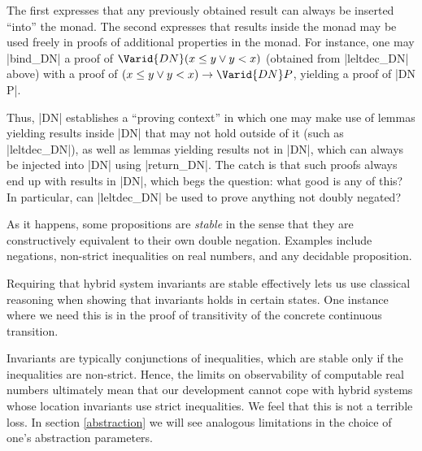 \documentclass[runningheads]{llncs}
\newcommand{\weg}[1]{}
\newcommand{\DN}{{\sf DN}\,}
\newcommand{\Inv}{{\rm Inv}}
\newcommand{\leltdecDN}{{\tt leltdecDN}}
\begin{document}
The first expresses that any previously obtained result can always be
inserted ``into'' the monad. The second expresses that results inside
the monad may be used freely in proofs of additional properties in the
monad. For instance, one may |bind_DN| a proof of $\Varid{DN} (x \leq y \vee y < x)$
(obtained from |leltdec_DN| above) with a proof of $(x \leq y \vee y < x) \rightarrow \Varid{DN} P$, yielding a proof of |DN P|.
 
Thus, |DN| establishes a ``proving context'' in which one may make
use of lemmas yielding results inside |DN| that may not hold outside
of it (such as |leltdec_DN|), as well as lemmas yielding results
not in |DN|, which can always be injected into |DN| using
|return_DN|. The catch is that such proofs always end up with results
in |DN|, which begs the question: what good is any of this? In
particular, can |leltdec_DN| be used to prove anything not doubly
negated?
 
As it happens, some propositions are \emph{stable} in the sense that they are constructively equivalent to their own double negation. Examples include
negations, non-strict inequalities on real numbers, and any decidable
proposition.

Requiring that hybrid system invariants are stable effectively lets us use classical reasoning when showing that invariants holds in certain states. One instance where we need this is in the proof of transitivity of the concrete continuous transition.

\weg{ %
We have seen why we required invariant stability:
in the transitivity proof for continuous transitions
it allows
us to employ $\leltdecDN$ to do case distinction on the $t$ variable
when showing that the invariant holds at each point along the
composite path. That is, we simply bind $\leltdecDN t d$ of type
$\DN (t \leq d \vee d < t)$ with the straightforward proof of $(t \leq d
\vee d < t) \rightarrow \DN (\Inv_l(\Phi_l (p, t)))$, and
then pull the latter out of $\DN$ on account of its stability.
}

Invariants are typically conjunctions of inequalities, which are
stable only if the inequalities are non-strict. Hence, the limits on
observability of computable real numbers ultimately mean that our
development cannot cope with hybrid systems whose location invariants
use strict inequalities. We feel that this is not a terrible loss. In
section \ref{abstraction} we will see analogous limitations in the
choice of one's abstraction parameters.
 
\end{document}
